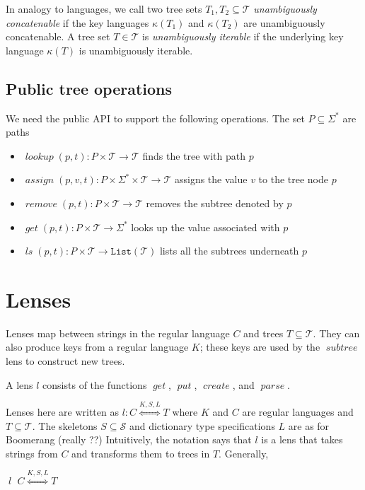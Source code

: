 \documentclass[12pt,fleqn]{amsart}
\newcommand{\ensmath}[1]{\ensuremath{#1}\xspace}
\newcommand{\opnam}[1]{\ensmath{\operatorname{\mathit{#1}}}}
\newcommand{\nget}{\opnam{get}}
\newcommand{\nput}{\opnam{put}}
\newcommand{\nparse}{\opnam{parse}}
\newcommand{\ncreate}{\opnam{create}}
\newcommand{\lenstype}[3][K]{\ensmath{{#2}\stackrel{#1}{\Longleftrightarrow}{#3}}}
\newcommand{\lens}[1]{\opnam{#1}}
\newcommand{\Trees}{\ensmath{\mathcal T}}
\newcommand{\Words}{\ensmath{\Sigma^*}}
\newcommand{\List}[1]{\ensmath{\mathtt{List(#1)}}}
\newcommand{\Skel}{\ensmath{\mathcal{S}}}
\newcommand{\Powerset}{\ensmath{\mathcal{P}}}
\newcommand{\Keys}{\ensmath{\mathcal{K}}}
\newcommand{\key}[1]{\ensmath{\kappa(#1)}}
\newcommand{\lto}{\ensmath{\longrightarrow}}
\newcommand{\Dictlangs}{\ensmath{\List{\Powerset(\Skel)}}}
\begin{document}
In analogy to languages, we call two tree sets $T_1, T_2 \subseteq \Trees$
\emph{unambiguously concatenable} if the key languages $\key{T_1}$ and
$\key{T_2}$ are unambiguously concatenable. A tree set $T\in\Trees$ is
\emph{unambiguously iterable} if the underlying key language $\key{T}$ is
unambiguously iterable.

\subsection{Public tree operations}
We need the public API to support the following operations. The set
$P\subseteq \Sigma^*$ are paths

\begin{itemize}
  \item $\opnam{lookup}(p, t): P \times \Trees \lto \Trees$ finds the tree
    with path $p$
  \item $\opnam{assign}(p, v, t): P \times \Sigma^* \times \Trees \lto
    \Trees$ assigns the value $v$ to the tree node $p$
  \item $\opnam{remove}(p, t): P \times \Trees \lto \Trees$ removes the
    subtree denoted by $p$
  \item $\opnam{get}(p, t): P \times \Trees \lto \Sigma^*$ looks up the
    value associated with $p$
    \item $\opnam{ls}(p, t): P \times \Trees \lto \List{\Trees}$ lists all
      the subtrees underneath $p$
\end{itemize}

\section{Lenses}

Lenses map between strings in the regular language $C$ and trees
$T\subseteq\Trees$. They can also produce keys from a regular language $K$;
these keys are used by the $\lens{subtree}$ lens to construct new
trees.

A lens $l$ consists of the functions $\nget$, $\nput$, $\ncreate$, and
$\nparse$.

Lenses here are written as $l:\lenstype[K,S,L]{C}{T}$ where $K$ and $C$ are
regular languages and $T\subseteq\Trees$.  The skeletons $S\subseteq\Skel$
and dictionary type specifications $L$ are as for Boomerang (really ??)
Intuitively, the notation says that $l$ is a lens that takes strings from
$C$ and transforms them to trees in $T$. Generally,

\infrule{C\subseteq\Words \andalso K\subseteq\List{\Keys}
           \andalso T\subseteq\Trees
           \andalso S\subseteq\Skel \andalso L \in \Dictlangs}
        {\lens{l} \in \lenstype[K,S,L]{C}{T}}
\end{document}
